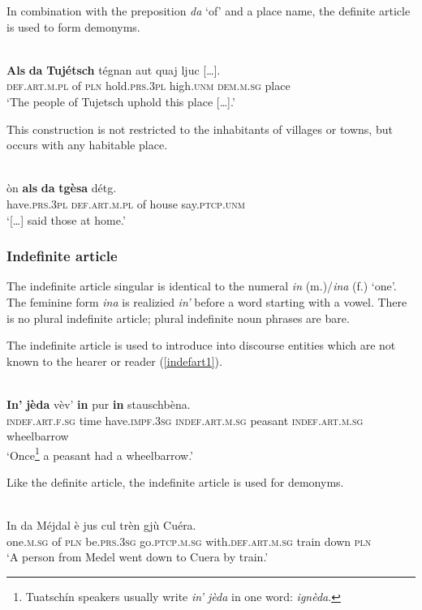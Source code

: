 In combination with the preposition \textit{da} ‘of’ and a place name, the definite article is used to form demonyms.

\ea
\label{}
\\
\gll    \textbf{Als} \textbf{da} \textbf{Tujétsch} tégnan aut quaj ljuc […].\\
    \textsc{def.art.m.pl} of \textsc{pln} hold.\textsc{prs.3pl} high.\textsc{unm} \textsc{dem.m.sg} place\\
\glt `The people of Tujetsch uphold this place […].'
\z

This construction is not restricted to the inhabitants of villages or towns, but occurs with any habitable place.

\ea\label{}
\\
\gll […] òn \textbf{als} \textbf{da} \textbf{tgèsa} détg.\\
{} have.\textsc{prs.3pl} \textsc{def.art.m.pl} of house say.\textsc{ptcp.unm}\\
\glt `[…] said those at home.'
\z


\subsubsection{Indefinite article}
The indefinite article singular is identical to the numeral \textit{in} (m.)/\textit{ina} (f.) ‘one’. The feminine form \textit{ina} is realizied \textit{in'} before a word starting with a vowel. There is no plural indefinite article; plural indefinite noun phrases are bare.

The indefinite article is used to introduce into discourse entities which are not known to the hearer or reader  (\ref{indefart1}). 

\ea\label{indefart1}
\\
\gll \textbf{In'} \textbf{jèda} vèv’ \textbf{in} pur \textbf{in} stauschbèna.\\
     \textsc{indef.art.f.sg} time have.\textsc{impf.3sg} \textsc{indef.art.m.sg} peasant \textsc{indef.art.m.sg} wheelbarrow \\
\glt `Once\footnote{Tuatschín speakers usually write \textit{in' jèda} in one word: \textit{ignèda}.} a peasant had a wheelbarrow.'
\z

Like the definite article, the indefinite article is used for demonyms.

\ea\label{}
\\
\gll   In da Méjdal è jus cul trèn gjù Cuéra.\\
     one.\textsc{m.sg} of \textsc{pln} be.\textsc{prs.3sg} go.\textsc{ptcp.m.sg} with.\textsc{def.art.m.sg} train down \textsc{pln}\\
\glt `A person from Medel went down to Cuera by train.'
\z

